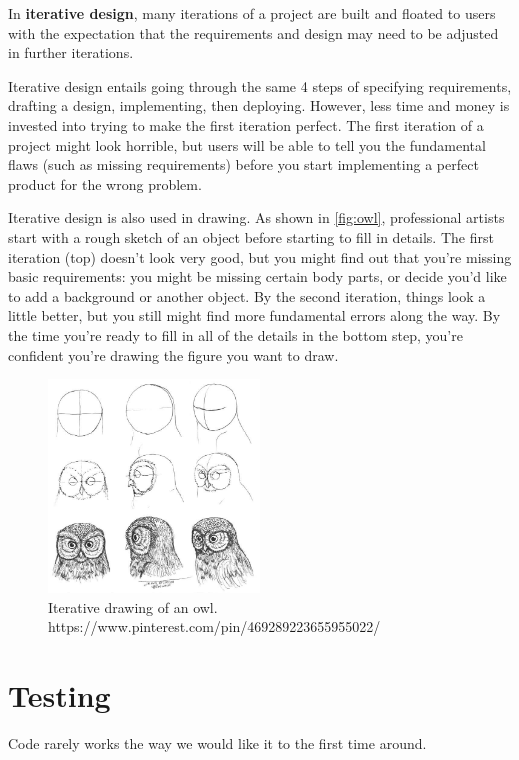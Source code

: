 \begin{definition}
In \textbf{iterative design}, many iterations of a project are built and floated to users with the expectation that the requirements and design may need to be adjusted in further iterations. 
\end{definition}

Iterative design entails going through the same 4 steps of specifying requirements, drafting a design, implementing, then deploying. However, less time and money is invested into trying to make the first iteration perfect. The first iteration of a project might look horrible, but users will be able to tell you the fundamental flaws (such as missing requirements) before you start implementing a perfect product for the wrong problem. 

Iterative design is also used in drawing. As shown in \autoref{fig:owl}, professional artists start with a rough sketch of an object before starting to fill in details. The first iteration (top) doesn't look very good, but you might find out that you're missing basic requirements: you might be missing certain body parts, or decide you'd like to add a background or another object. By the second iteration, things look a little better, but you still might find more fundamental errors along the way. By the time you're ready to fill in all of the details in the bottom step, you're confident you're drawing the figure you want to draw. 

\begin{figure}
	\centering
	\includegraphics[width=0.5\textwidth]{images/owl.jpg}
	\caption{Iterative drawing of an owl. https://www.pinterest.com/pin/469289223655955022/}
	\label{fig:owl}
\end{figure}

\section{Testing}
Code rarely works the way we would like it to the first time around. 

